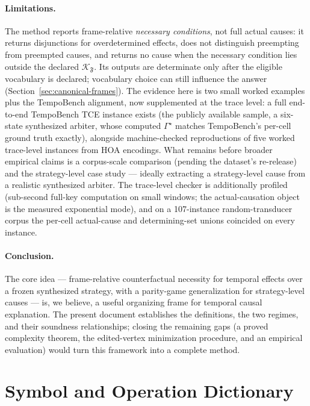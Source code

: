 \documentclass[11pt]{article}
\theoremstyle{remark}
\newcommand{\Frame}{\mathfrak{F}}
\begin{document}
\paragraph{Limitations.} The method reports frame-relative \emph{necessary
conditions}, not full actual causes: it returns disjunctions for overdetermined
effects, does not distinguish preempting from preempted causes, and returns no
cause when the necessary condition lies outside the declared
\(\mathcal{K}_{\Frame}\). Its outputs are determinate only after the eligible
vocabulary is declared; vocabulary choice can still influence the answer
(Section~\ref{sec:canonical-frames}). The evidence here is two small worked
examples plus the TempoBench alignment, now supplemented at the trace level: a
full end-to-end TempoBench TCE instance exists (the publicly available sample,
a six-state synthesized arbiter, whose computed \(\Gamma^{\star}\) matches
TempoBench's per-cell ground truth exactly), alongside machine-checked
reproductions of five worked trace-level instances from HOA encodings. What
remains before broader empirical claims is a corpus-scale comparison (pending
the dataset's re-release) and the strategy-level case study --- ideally
extracting a strategy-level cause from a realistic synthesized arbiter. The
trace-level checker is additionally profiled (sub-second full-key computation
on small windows; the actual-causation object is the measured exponential
mode), and on a 107-instance random-transducer corpus the per-cell
actual-cause and determining-set unions coincided on every instance.

\paragraph{Conclusion.} The core idea --- frame-relative counterfactual necessity
for temporal effects over a frozen synthesized strategy, with a parity-game
generalization for strategy-level causes --- is, we believe, a useful organizing
frame for temporal causal explanation. The present document establishes the
definitions, the two regimes, and their soundness relationships; closing the
remaining gaps (a proved complexity theorem, the edited-vertex minimization
procedure, and an empirical evaluation) would turn this framework into a complete
method.

\appendix

\section{Symbol and Operation Dictionary}
\label{app:symbols}
\end{document}
